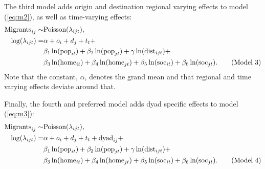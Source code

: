 \documentclass[11pt,parskip,abstracton,notitlepage, dvipsnames]{scrartcl}
\begin{document}
The third model adds origin and destination regional varying effects to model (\ref{eq:m2}), as well as time-varying effects:
\begin{align} \text{Migrants}_{ij} \sim & \text{Poisson}(\lambda_{ijt}), \notag \\
  \log(\lambda_{ijt}) = & \alpha +  o_i + d_j + t_t + \notag \\
                                        &\beta_1 \ln(\text{pop}_{it}) + \beta_2
                                          \ln(\text{pop}_{jt}) +
                                          \gamma \ln(\text{dist}_{ijt}) + \notag \\
                                        & \beta_3 \ln(\text{home}_{it}) +
                                          \beta_4 \ln(\text{home}_{jt}) +
                                          \beta_5 \ln(\text{soc}_{it}) + \beta_6
                                          \ln(\text{soc}_{jt}).  \tag{Model
                                          3} \label{eq:m3}
\end{align}
Note that the constant, $\alpha$, denotes the grand mean and that regional and time varying effects deviate around that.

Finally, the fourth and preferred model adds dyad specific effects to model (\ref{eq:m3}):                                          
  \begin{align} \text{Migrants}_{ij} \sim & \text{Poisson}(\lambda_{ijt}), \notag \\
    \log(\lambda_{ijt}) = & \alpha +  o_i + d_j + t_t + \text{dyad}_{ij}+ \notag \\
                                          & \beta_1 \ln(\text{pop}_{it}) +
                                            \beta_2 \ln(\text{pop}_{jt}) +
                                            \gamma \ln(\text{dist}_{ijt}) + \notag \\
                                          & \beta_3 \ln(\text{home}_{it}) +
                                            \beta_4 \ln(\text{home}_{jt}) +
                                            \beta_5 \ln(\text{soc}_{it}) +
                                            \beta_6
                                            \ln(\text{soc}_{jt}). \tag{Model
                                            4} \label{eq:m4}
\end{align}
\end{document}
